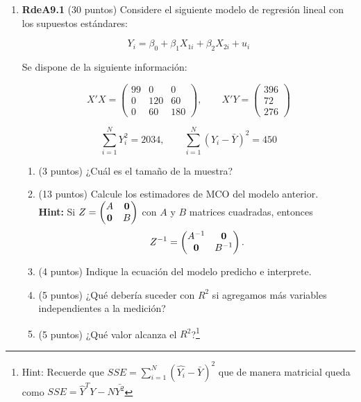 \documentclass[10pt,a4paper]{article}
\begin{document}
\begin{enumerate}
    \item \textbf{RdeA9.1} (30 puntos) 
Considere el siguiente modelo de regresión lineal con los supuestos estándares:

\[
Y_i = \beta_0 + \beta_1 X_{1i} + \beta_2 X_{2i} + u_i
\]

Se dispone de la siguiente información:

\[
X'X = 
\begin{pmatrix}
99 & 0 & 0 \\
0 & 120 & 60 \\
0 & 60 & 180
\end{pmatrix},
\qquad
X'Y = 
\begin{pmatrix}
396 \\
72 \\
276
\end{pmatrix}
\]

\[
\sum_{i=1}^{N} Y_i^2 = 2034, 
\qquad 
\sum_{i=1}^{N} (Y_i - \bar{Y})^2 = 450
\]

\begin{enumerate}
    \item (3 puntos) ¿Cuál es el tamaño de la muestra?\\

    \item (13 puntos) Calcule los estimadores de MCO del modelo anterior.\\
    \textbf{Hint:} Si \( Z = \begin{pmatrix} A &{\bf 0} \\ {\bf 0} & B \end{pmatrix} \) con \( A \) y \( B \) matrices cuadradas, entonces
    \[
    Z^{-1} = \begin{pmatrix} A^{-1} & {\bf 0} \\ {\bf 0} & B^{-1} \end{pmatrix}.
    \]
    
    \item (4 puntos) Indique la ecuación del modelo predicho e interprete.\\
    
    \item (5 puntos) ¿Qué debería suceder con $R^2$ si agregamos más variables independientes a la medición?\\


    \item (5 puntos) ¿Qué valor alcanza el $R^2$?\footnote{Hint: Recuerde que $SSE = \sum_{i=1}^N (\hat{Y_i} - \bar{Y})^2$ que de manera matricial queda como $SSE=\hat{Y}^T Y - N \bar{Y^2}$}\\
\end{enumerate}


\end{enumerate}
\end{document}

